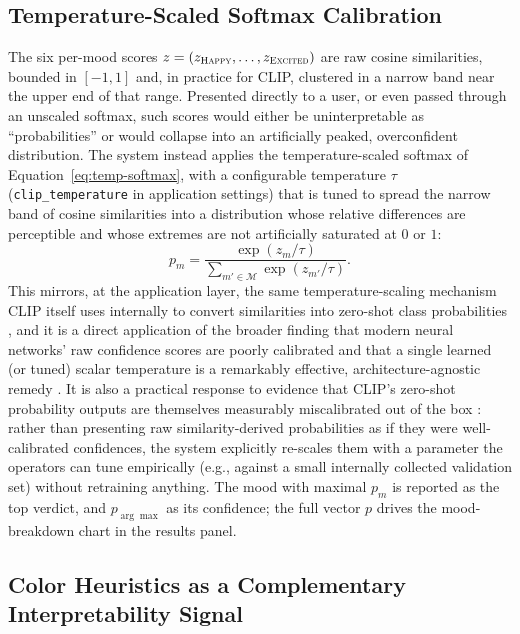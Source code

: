 \documentclass[10pt,twocolumn,letterpaper]{article}
\begin{document}
\subsection{Temperature-Scaled Softmax Calibration}

The six per-mood scores $z = (z_{\textsc{Happy}}, \ldots, z_{\textsc{Excited}})$ are raw cosine similarities, bounded in $[-1, 1]$ and, in practice for CLIP, clustered in a narrow band near the upper end of that range. Presented directly to a user, or even passed through an unscaled softmax, such scores would either be uninterpretable as ``probabilities'' or would collapse into an artificially peaked, overconfident distribution. The system instead applies the temperature-scaled softmax of Equation~\ref{eq:temp-softmax}, with a configurable temperature $\tau$ (\texttt{clip\_temperature} in application settings) that is tuned to spread the narrow band of cosine similarities into a distribution whose relative differences are perceptible and whose extremes are not artificially saturated at $0$ or $1$:
\begin{equation}
    p_m = \frac{\exp(z_m / \tau)}{\sum_{m' \in \mathcal{M}} \exp(z_{m'} / \tau)}.
    \label{eq:final-softmax}
\end{equation}
This mirrors, at the application layer, the same temperature-scaling mechanism CLIP itself uses internally to convert similarities into zero-shot class probabilities \cite{radford2021clip}, and it is a direct application of the broader finding that modern neural networks' raw confidence scores are poorly calibrated and that a single learned (or tuned) scalar temperature is a remarkably effective, architecture-agnostic remedy \cite{guo2017calibration}. It is also a practical response to evidence that CLIP's zero-shot probability outputs are themselves measurably miscalibrated out of the box \cite{tu2023clipcalibration}: rather than presenting raw similarity-derived probabilities as if they were well-calibrated confidences, the system explicitly re-scales them with a parameter the operators can tune empirically (e.g., against a small internally collected validation set) without retraining anything. The mood with maximal $p_m$ is reported as the top verdict, and $p_{\arg\max}$ as its confidence; the full vector $p$ drives the mood-breakdown chart in the results panel.

\subsection{Color Heuristics as a Complementary Interpretability Signal}
\label{sec:color}
\end{document}

